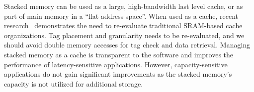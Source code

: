 
Stacked memory can be used as a large, high-bandwidth last level cache, or as part of main memory in a ``flat address space''. When used as a cache, recent research~\cite{chou-micro2014,qureshi-micro2012} demonstrates the need to re-evaluate traditional SRAM-based cache organizations. Tag placement and granularity needs to be re-evaluated, and we should avoid double memory accesses for tag 
check and data retrieval. Managing stacked memory as a cache is transparent 
to the software and improves the performance of latency-sensitive applications. However, capacity-sensitive applications do not gain significant improvements as the stacked memory's capacity is not utilized for additional storage.


